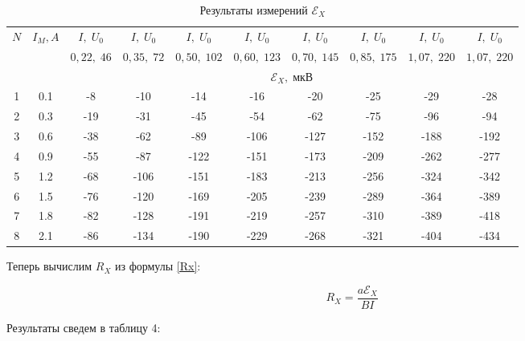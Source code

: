 \documentclass[12pt]{kiarticle}
\newcommand{\eds}{\ensuremath{ \mathscr{E}}}
\begin{document}
\begin{enumerate}
    \begin{table}[h!]
  	\centering
  	\caption{Результаты измерений $ \eds_X $}
  	\begin{tabularx}{\textwidth}{|c|c|c|c|c|c|c|c|c|c|}
  		\hline
  		\multirow{3}{*}{$ N $} & \multirow{3}{*}{$ I_M, A $} & 
  		$I, \; U_0 $ &
  		$I, \;U_0 $ &
  		$I, \;U_0 $ &
  		$I, \;U_0 $ &
  		$I, \;U_0 $ & 
  		$I, \;U_0 $ &
  		$I, \;U_0 $ &
  		$I, \;U_0 $ 
  		\\
  		& &
  		$0,22,  \;46$ &
  		$ 0,35,  \;72 $ &
  		$  0,50, \;102$ &
  		$  0,60,  \;123$ &
  		$ 0,70,  \;145$ & 
  		$ 0,85, \; 175$ &
  		$  1,07,  \;220 $  &
  		$ 1,07,\; 220 $
  		\\
  		\cline{3-10}
  		& & \multicolumn{8}{|c|}{$ \eds_X, \; мкВ $} \\
  		\hline
  	1 & 0.1 & -8 & -10 & -14 & -16 & -20 & -25 & -29 & -28 \\
  	2 & 0.3 & -19 & -31 & -45 & -54 & -62 & -75 & -96 & -94 \\
  	3 & 0.6 & -38 & -62 & -89 & -106 & -127 & -152 & -188 & -192 \\
  	4 & 0.9 & -55 & -87 & -122 & -151 & -173 & -209 & -262 & -277 \\
  	5 & 1.2 & -68 & -106 & -151 & -183 & -213 & -256 & -324 & -342 \\
  	6 & 1.5 & -76 & -120 & -169 & -205 & -239 & -289 & -364 & -389 \\
  	7 & 1.8 & -82 & -128 & -191 & -219 & -257 & -310 & -389 & -418 \\
  	8 & 2.1 & -86 & -134 & -190 & -229 & -268 & -321 & -404 & -434 \\
  		\hline
  	\end{tabularx}
  	\label{resF}%
  \end{table}%
  
  Теперь вычислим $ R_X $ из формулы \eqref{Rx}:
  
  \begin{equation}\label{}
  R_X = \dfrac{a\eds_X}{BI}
  \end{equation}
  
  Результаты сведем в таблицу 4:
  

\end{enumerate}
\end{document}
